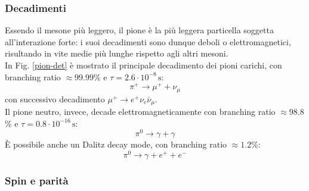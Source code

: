 \subsubsection{Decadimenti}

Essendo il mesone più leggero, il pione è la più leggera particella soggetta all'interazione forte: i suoi decadimenti sono dunque deboli o elettromagnetici, risultando in vite medie più lunghe rispetto agli altri mesoni.\\
In Fig. \ref{pion-det} è mostrato il principale decadimento dei pioni carichi, con branching ratio $ \approx 99.99 $\% e $ \tau = 2.6\cdot10^{-8}\,\text{s} $:
\begin{equation*}
	\pi^+ \rightarrow \mu^+ + \nu_{\mu}
\end{equation*}
con successivo decadimento $ \mu^+ \rightarrow e^+ \nu_e \bar{\nu}_{\mu} $.\\
Il pione neutro, invece, decade elettromagneticamente con branching ratio $ \approx 98.8 $\% e $ \tau = 0.8\cdot10^{-16}\,\text{s} $:
\begin{equation*}
	\pi^0 \rightarrow \gamma + \gamma
\end{equation*}
È possibile anche un Dalitz decay mode, con branching ratio $ \approx 1.2 $\%:
\begin{equation*}
	\pi^0 \rightarrow \gamma + e^+ + e^-
\end{equation*}

\subsubsection{Spin e parità}

